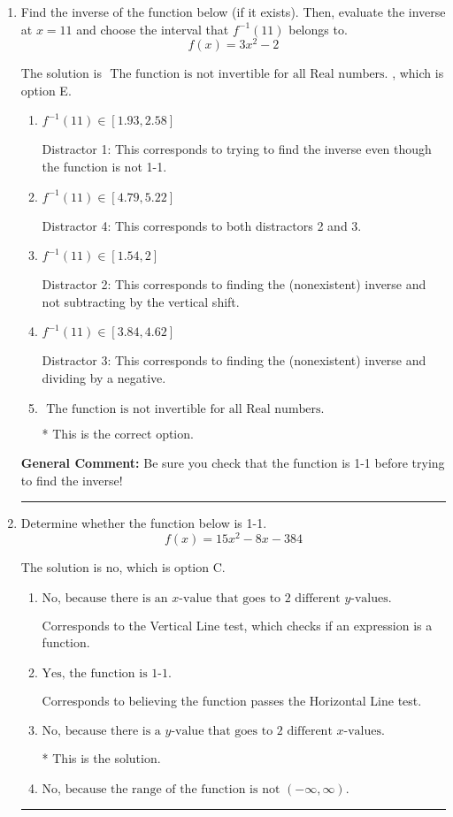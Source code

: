 \documentclass{extbook}[14pt]
\newcommand{\litem}[1]{\item #1

\rule{\textwidth}{0.4pt}}
\begin{document}
\begin{enumerate}\litem{
Find the inverse of the function below (if it exists). Then, evaluate the inverse at $x = 11$ and choose the interval that $f^{-1}(11)$ belongs to.
\[ f(x) = 3 x^2 - 2 \]

The solution is \( \text{ The function is not invertible for all Real numbers. } \), which is option E.\begin{enumerate}[label=\Alph*.]
\item \( f^{-1}(11) \in [1.93, 2.58] \)

 Distractor 1: This corresponds to trying to find the inverse even though the function is not 1-1. 
\item \( f^{-1}(11) \in [4.79, 5.22] \)

 Distractor 4: This corresponds to both distractors 2 and 3.
\item \( f^{-1}(11) \in [1.54, 2] \)

 Distractor 2: This corresponds to finding the (nonexistent) inverse and not subtracting by the vertical shift.
\item \( f^{-1}(11) \in [3.84, 4.62] \)

 Distractor 3: This corresponds to finding the (nonexistent) inverse and dividing by a negative.
\item \( \text{ The function is not invertible for all Real numbers. } \)

* This is the correct option.
\end{enumerate}

\textbf{General Comment:} Be sure you check that the function is 1-1 before trying to find the inverse!
}
\litem{
Determine whether the function below is 1-1.
\[ f(x) = 15 x^2 - 8 x - 384 \]

The solution is \( \text{no} \), which is option C.\begin{enumerate}[label=\Alph*.]
\item \( \text{No, because there is an $x$-value that goes to 2 different $y$-values.} \)

Corresponds to the Vertical Line test, which checks if an expression is a function.
\item \( \text{Yes, the function is 1-1.} \)

Corresponds to believing the function passes the Horizontal Line test.
\item \( \text{No, because there is a $y$-value that goes to 2 different $x$-values.} \)

* This is the solution.
\item \( \text{No, because the range of the function is not $(-\infty, \infty)$.} \)


\end{enumerate}}
\end{enumerate}
\end{document}
